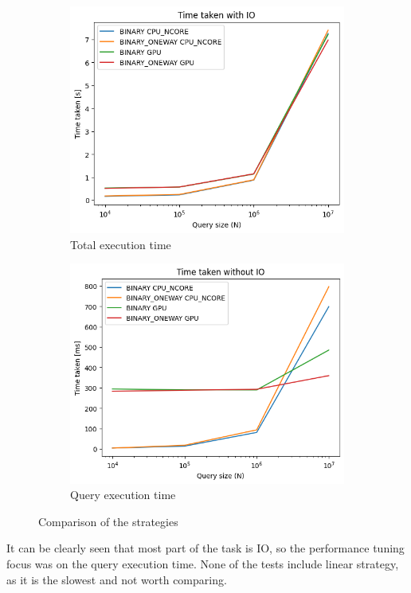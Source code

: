 \documentclass[a4paper,12pt]{article}
\begin{document}
    \begin{figure}[h]
        \begin{subfigure}{.5\textwidth}
            \centering
            \includegraphics[width=.8\linewidth]{img/time_N_total_time}
            \caption{Total execution time}
            \label{fig:sub1}
        \end{subfigure}%
        \begin{subfigure}{.5\textwidth}
            \centering
            \includegraphics[width=.8\linewidth]{img/time_N_query_time}
            \caption{Query execution time}
            \label{fig:sub2}
        \end{subfigure}
        \caption{Comparison of the strategies}
        \label{fig:test}
    \end{figure}

    It can be clearly seen that most part of the task is IO,
    so the performance tuning focus was on the query execution time.
    None of the tests include linear strategy, as it is the slowest and not worth comparing.
\end{document}
